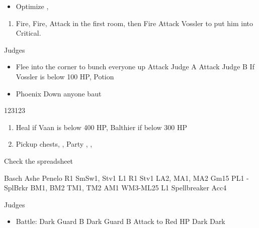 \begin{equip}
	\begin{itemize}
		\item Optimize \basch, \vaan
	\end{itemize}
\end{equip}
\begin{enumerate}
	\item Fire, Fire, Attack in the first room, then Fire Attack Vossler to put him into Critical.
\end{enumerate}
\begin{battle}{Judges}
	\begin{itemize}
		\item Flee into the corner to bunch everyone up
		      \vaanf Attack Judge A
		      \baschf Attack Judge B
		      \balthierf If Vossler is below 100 HP, Potion
		\item Phoenix Down anyone baut \balthier
	\end{itemize}
\end{battle}
\begin{shop}{123123}
\end{shop}
\begin{enumerate}
	\item Heal if Vaan is below 400 HP, Balthier if below 300 HP
	\item Pickup chests, \leader{\vaan}, Party \vaan, \penelo, \ashe
\end{enumerate}
\begin{liscense}
	Check the spreadsheet

	Basch	Ashe	Penelo
	R1	SmSw1, Stv1	L1
	R1	Stv1
	LA2, MA1, MA2
	Gm15
	PL1 - SplBrkr
	BM1, BM2
	TM1, TM2
	AM1
	WM3-ML25	L1
	Spellbreaker
	Acc4
\end{liscense}
\begin{battle}{Judges}
	\begin{itemize}
		\vaanf Reflect \ashe
		\ashef Heal \vaan
		\penelof Reflect \penelo
		\vaanf Reflect \vaan
		\item Battle:
		      \vaanf Dark Guard B
		      \penelof Dark Guard B
		      \ashef Attack \penelo to Red HP
		      \vaanf Dark \penelo
		      \penelof Dark \penelo
	\end{itemize}
\end{battle}